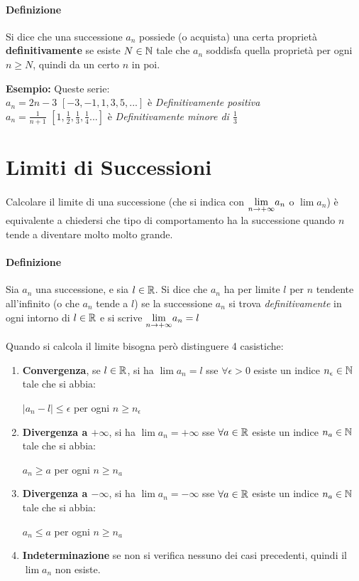 \documentclass[12pt, a4paper, openany]{book}
\newcommand{\esempio}[1]{\begin{box_esempio} \textbf{Esempio: }#1\end{box_esempio}}
\begin{document}
\paragraph*{Definizione} Si dice che una successione {$a_n$} possiede (o acquista) una certa proprietà \textbf{definitivamente} se esiste $N \in \mathbb{N}$ tale che
$a_n$ soddisfa quella proprietà per ogni $n \geq N$, quindi da un certo $n$ in poi.

\esempio{Queste serie:\\
    $a_n = 2n-3$ $[-3,-1,1,3,5,...]$  è \emph{Definitivamente positiva}\\
    $a_n =\frac{1}{n+1}$ $[1, \frac{1}{2}, \frac{1}{3},\frac{1}{4}...] $ è \emph{Definitivamente minore di $\frac{1}{3}$}
}

\section{Limiti di Successioni}
\paragraph*{}Calcolare il limite di una successione (che si indica con $\underset{n \to +\infty}{\lim}a_n$ o $\lim a_n$)
è equivalente a chiedersi che tipo di comportamento ha la successione quando $n$ tende a diventare molto molto grande.

\paragraph*{Definizione} Sia $a_n$ una successione, e sia $l \in \mathbb{R}$.
Si dice che $a_n$ ha per limite $l$ per $n$ tendente all'infinito (o che $a_n$ tende a $l$)
se la successione $a_n$ si trova \emph{definitivamente} in ogni intorno di $l \in \mathbb{R}$
e si scrive $\underset{n \to +\infty}{\lim} a_n = l$

Quando si calcola il limite bisogna però distinguere 4 casistiche:
\begin{enumerate}
    \item \textbf{Convergenza}, se $l\in\mathbb{R}$, si ha $\lim a_n = l$ sse $\forall \epsilon > 0$ esiste un indice $n_\epsilon\in\mathbb{N}$ tale che si abbia:
    \begin{center}
        $|a_n-l|\leq\epsilon$ per ogni $n \geq n_\epsilon$
    \end{center}
    \item \textbf{Divergenza a $+\infty$}, si ha $\lim a_n = +\infty$ sse $\forall a\in \mathbb{R}$ esiste un indice $n_a\in\mathbb{N}$ tale che si abbia:
    \begin{center}
        $a_n\geq a$ per ogni $n \geq n_a$
    \end{center}
    \item \textbf{Divergenza a $-\infty$}, si ha $\lim a_n = -\infty$ sse $\forall a\in \mathbb{R}$ esiste un indice $n_a\in\mathbb{N}$ tale che si abbia:
    \begin{center}
        $a_n\leq a$ per ogni $n \geq n_a$
    \end{center}
    \item \textbf{Indeterminazione} se non si verifica nessuno dei casi precedenti, quindi il $\lim a_n$ non esiste.
\end{enumerate}
\end{document}
